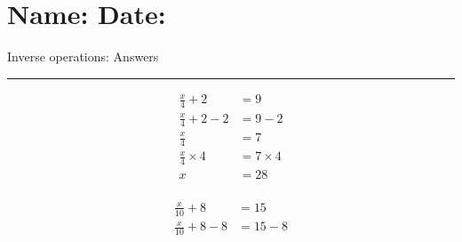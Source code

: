 \documentclass[12pt]{article}
\def \HeadingAnswers {\section*{\Large Name: \underline{\hspace{8cm}} \hfill Date: \underline{\hspace{3cm}}} \vspace{-3mm}
{Inverse operations: Answers} \vspace{1pt}\hrule}
\newcounter{minipagecount}
\begin{document}
\HeadingAnswers
\vspace{1mm}
\begin{multicols}{2}
\noindent{(\theminipagecount)}\hspace{0.1mm} %
\begin{minipage}[t]{0.45\textwidth} %
    \vspace{-26pt}  %
    \raggedright %
    \begin{align*} %
        \frac{x}{4} + 2 &= 9\\
        \frac{x}{4} + 2 - 2 &= 9 - 2\\
        \frac{x}{4} &= 7\\
        \frac{x}{4} \times4 &= 7 \times4\\
        x &= 28\\
    \end{align*}
\end{minipage} %
\noindent{(\theminipagecount)}\hspace{0.1mm} %
\begin{minipage}[t]{0.45\textwidth} %
    \vspace{-26pt}  %
    \raggedright %
    \begin{align*} %
        \frac{x}{10} + 8 &= 15\\
        \frac{x}{10} + 8 - 8 &= 15 - 8\\

\end{align*}
\end{minipage}
\end{multicols}
\end{document}
